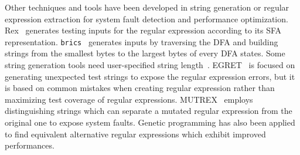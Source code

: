 Other techniques and tools have been developed in string generation or regular expression extraction for system fault detection and performance optimization. Rex~\cite{rex} generates testing inputs for the regular expression according to its SFA representation. {\tt brics}~\cite{brics} generates inputs by traversing the DFA and building strings from the smallest bytes to the largest bytes of every DFA states. 
Some string generation tools need user-specified string length~\cite{kiezun2009hampi, brics, Ghosh:2013:JAT:2486788.2486925}. EGRET~\cite{larson2016generating} is focused on generating unexpected test strings to expose the regular expression errors, but it is based on common mistakes when creating regular expression rather than maximizing test coverage of regular expressions. MUTREX~\cite{7899040} employs distinguishing strings which can separate a mutated regular expression from the original one to expose system faults. Genetic programming has also been applied~\cite{cody2017search} to find equivalent alternative regular expressions which exhibit improved performances. %
